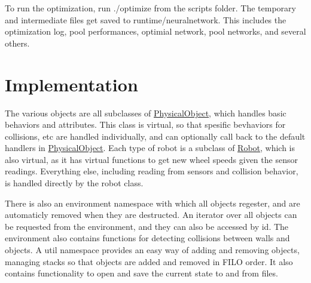To run the optimization, run ./optimize from the scripts folder. The temporary and intermediate files get saved to runtime/neuralnetwork. This includes the optimization log, pool performances, optimial network, pool networks, and several others.\hypertarget{index_Implementation}{}\section{Implementation}\label{index_Implementation}
The various objects are all subclasses of \hyperlink{classPhysicalObject}{Physical\-Object}, which handles basic behaviors and attributes. This class is virtual, so that spesific bevhaviors for collisions, etc are handled individually, and can optionally call back to the default handlers in \hyperlink{classPhysicalObject}{Physical\-Object}. Each type of robot is a subclass of \hyperlink{classRobot}{Robot}, which is also virtual, as it has virtual functions to get new wheel speeds given the sensor readings. Everything else, including reading from sensors and collision behavior, is handled directly by the robot class.

There is also an environment namespace with which all objects regester, and are automaticly removed when they are destructed. An iterator over all objects can be requested from the environment, and they can also be accessed by id. The environment also contains functions for detecting collisions between walls and objects. A util namespace provides an easy way of adding and removing objects, managing stacks so that objects are added and removed in F\-I\-L\-O order. It also contains functionality to open and save the current state to and from files.

